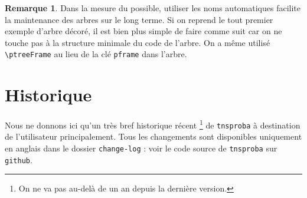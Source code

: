 \documentclass[12pt,a4paper]{article}
\theoremstyle{definition}
\newtheorem*{remark}{Remarque}
\newcommand\env[1]{\texttt{#1}}
\newcommand\macro[1]{\env{\textbackslash{}#1}}
\begin{document}
\begin{remark}
	Dans la mesure du possible, utiliser les noms automatiques facilite la maintenance des arbres sur le long terme.
	Si on reprend le tout premier exemple d'arbre décoré, il est bien plus simple de faire comme suit car on ne touche pas à la structure minimale du code de l'arbre.
	On a même utilisé \macro{ptreeFrame} au lieu de la clé \verb#pframe# dans l'arbre.

\end{remark}
\newpage

\section{Historique}

Nous ne donnons ici qu'un très bref historique récent
\footnote{
	On ne va pas au-delà de un an depuis la dernière version.
}
de \verb+tnsproba+ à destination de l'utilisateur principalement.
Tous les changements sont disponibles uniquement en anglais dans le dossier \verb+change-log+ : voir le code source de \verb+tnsproba+ sur \verb+github+.
\end{document}
